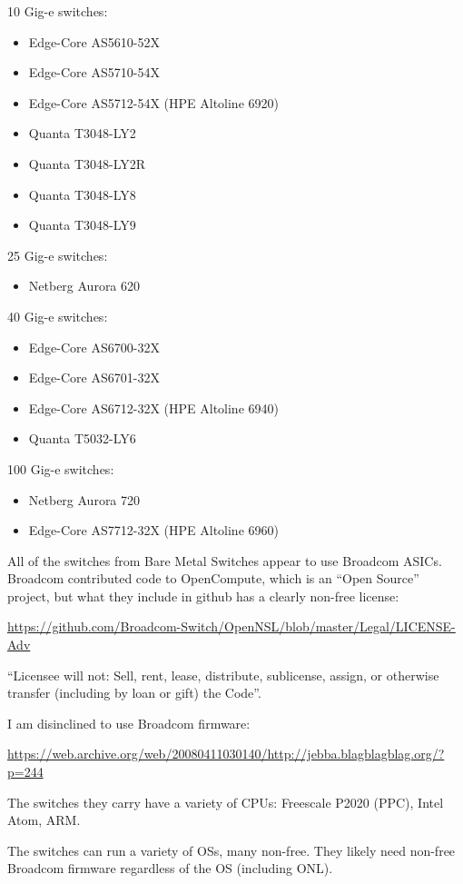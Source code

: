 10 Gig-e switches:
\begin{itemize}
 \item Edge-Core AS5610-52X
 \item Edge-Core AS5710-54X
 \item Edge-Core AS5712-54X (HPE Altoline 6920)
 \item Quanta T3048-LY2
 \item Quanta T3048-LY2R
 \item Quanta T3048-LY8
 \item Quanta T3048-LY9
\end{itemize}


25 Gig-e switches:
\begin{itemize}
 \item Netberg Aurora 620
\end{itemize}


40 Gig-e switches:
\begin{itemize}
 \item Edge-Core AS6700-32X
 \item Edge-Core AS6701-32X
 \item Edge-Core AS6712-32X (HPE Altoline 6940)
 \item Quanta T5032-LY6
\end{itemize}


100 Gig-e switches:
\begin{itemize}
 \item Netberg Aurora 720
 \item Edge-Core AS7712-32X (HPE Altoline 6960)
\end{itemize}


All of the switches from Bare Metal Switches appear to use Broadcom ASICs.
Broadcom contributed code to OpenCompute, which is an ``Open Source'' project,
but what they include in github has a clearly non-free license:


\url{https://github.com/Broadcom-Switch/OpenNSL/blob/master/Legal/LICENSE-Adv}


``Licensee will not:
Sell, rent, lease, distribute, sublicense, assign, or otherwise transfer
(including by loan or gift) the Code''.


I am disinclined to use Broadcom firmware:


\url{https://web.archive.org/web/20080411030140/http://jebba.blagblagblag.org/?p=244}


The switches they carry have a variety of CPUs:
Freescale P2020 (PPC), Intel Atom, ARM.


The switches can run a variety of OSs, many non-free. They likely need non-free
Broadcom firmware regardless of the OS (including ONL).


